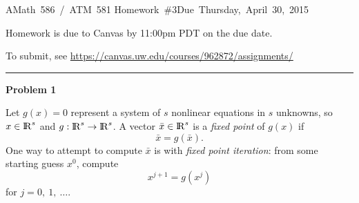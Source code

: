 \documentclass[10pt]{article}
\begin{document}
\hfill\vbox{\hbox{AMath 586 / ATM 581}
\hbox{Homework \#3}\hbox{Due Thursday, April 30, 2015}}

\vskip 5pt

Homework is due to Canvas by 11:00pm PDT on the due date.

To submit, see \url{https://canvas.uw.edu/courses/962872/assignments/}


\vskip 1cm
\hrule
{\bf Problem 1}  


Let $g(x)=0$ represent a system of $s$ nonlinear equations in $s$ unknowns,
so $x\in{{\rm l} \kern -.15em {\rm R} }^s$ and $g: {{\rm l} \kern -.15em {\rm R} }^s \rightarrow {{\rm l} \kern -.15em {\rm R} }^s$.  A vector $\bar
x\in{{\rm l} \kern -.15em {\rm R} }^s$ is a {\em fixed point} of $g(x)$ if 
\begin{equation}\label{a}
\bar x = g(\bar x).
\end{equation}
One way to attempt to compute $\bar x$ is with {\em fixed point iteration}:
from some starting guess $x^0$, compute
\begin{equation}\label{b}
x^{j+1} = g(x^j)
\end{equation}
for $j=0,~1,~\ldots$.
\end{document}
